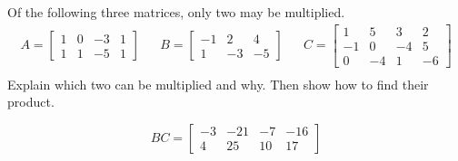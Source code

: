 
\begin{exerciseStatement}


Of the following three matrices, only two may be multiplied. 
\begin{align*} A= \left[\begin{array}{cccc}
1 & 0 & -3 & 1 \\
1 & 1 & -5 & 1
\end{array}\right]  & & B= \left[\begin{array}{ccc}
-1 & 2 & 4 \\
1 & -3 & -5
\end{array}\right]  & & C= \left[\begin{array}{cccc}
1 & 5 & 3 & 2 \\
-1 & 0 & -4 & 5 \\
0 & -4 & 1 & -6
\end{array}\right]  \\ \end{align*}
             Explain which two can be multiplied and why. Then show how to find their product.


\end{exerciseStatement}
    
\begin{exerciseAnswer} 
\[BC= \left[\begin{array}{cccc}
-3 & -21 & -7 & -16 \\
4 & 25 & 10 & 17
\end{array}\right] \]
\end{exerciseAnswer}
    
